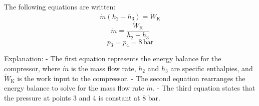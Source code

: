 The following equations are written:  
\[
\dot{m}(h_2 - h_3) = \dot{W}_\text{K}
\]  
\[
\dot{m} = \frac{\dot{W}_\text{K}}{h_2 - h_3}
\]  
\[
p_3 = p_4 = 8 \, \text{bar}
\]  

Explanation:  
- The first equation represents the energy balance for the compressor, where \( \dot{m} \) is the mass flow rate, \( h_2 \) and \( h_3 \) are specific enthalpies, and \( \dot{W}_\text{K} \) is the work input to the compressor.  
- The second equation rearranges the energy balance to solve for the mass flow rate \( \dot{m} \).  
- The third equation states that the pressure at points 3 and 4 is constant at 8 bar.